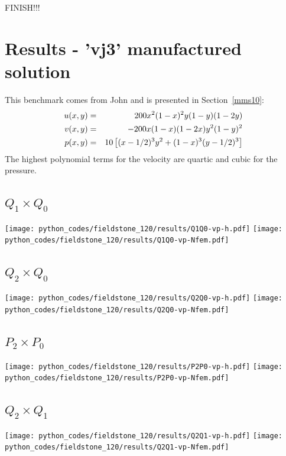 FINISH!!!

\newpage
\section*{Results - 'vj3' manufactured solution}

This benchmark comes from John \etal \cite{jolm17} and is presented in Section~\ref{mms10}:
\begin{eqnarray}
u(x,y) &=& 200x^2(1-x)^2y(1-y)(1-2y) \nonumber\\
v(x,y) &=& -200x(1-x)(1-2x)y^2(1-y)^2 \nonumber\\
p(x,y) &=& 10\left[(x-1/2)^3y^2+(1-x)^3(y-1/2)^3 \right] \nonumber
\end{eqnarray}
The highest polynomial terms for the velocity are quartic and cubic for the pressure.

\subsection*{$Q_1\times Q_0$}
\begin{center}
\texttt{[image: python\_codes/fieldstone\_120/results/Q1Q0-vp-h.pdf]}
\texttt{[image: python\_codes/fieldstone\_120/results/Q1Q0-vp-Nfem.pdf]}
\end{center}

\subsection*{$Q_2\times Q_0$}
\begin{center}
\texttt{[image: python\_codes/fieldstone\_120/results/Q2Q0-vp-h.pdf]}
\texttt{[image: python\_codes/fieldstone\_120/results/Q2Q0-vp-Nfem.pdf]}
\end{center}

\subsection*{$P_2\times P_0$}
\begin{center}
\texttt{[image: python\_codes/fieldstone\_120/results/P2P0-vp-h.pdf]}
\texttt{[image: python\_codes/fieldstone\_120/results/P2P0-vp-Nfem.pdf]}
\end{center}

\subsection*{$Q_2\times Q_1$}
\begin{center}
\texttt{[image: python\_codes/fieldstone\_120/results/Q2Q1-vp-h.pdf]}
\texttt{[image: python\_codes/fieldstone\_120/results/Q2Q1-vp-Nfem.pdf]}
\end{center}

